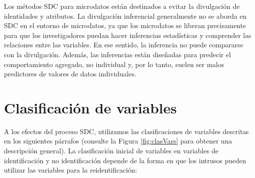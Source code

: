 \documentclass[]{book}
\theoremstyle{definition}
\theoremstyle{definition}
\theoremstyle{definition}
\theoremstyle{definition}
\theoremstyle{remark}
\begin{document}
Los métodos SDC para microdatos están destinados a evitar la divulgación de identidades y atributos. La divulgación inferencial generalmente no se aborda en SDC en el entorno de microdatos, ya que los microdatos se liberan precisamente para que los investigadores puedan hacer inferencias estadísticas y comprender las relaciones entre las variables. En ese sentido, la inferencia no puede compararse con la divulgación. Además, las inferencias están diseñadas para predecir el comportamiento agregado, no individual y, por lo tanto, suelen ser malos predictores de valores de datos individuales.

\hypertarget{clasificaciuxf3n-de-variables}{%
\section{Clasificación de variables}\label{clasificaciuxf3n-de-variables}}

A los efectos del proceso SDC, utilizamos las clasificaciones de variables descritas en los siguientes párrafos (consulte la Figura \ref{fig:clasVars} para obtener una descripción general). La clasificación inicial de variables en variables de identificación y no identificación depende de la forma en que los intrusos pueden utilizar las variables para la reidentificación:
\end{document}
